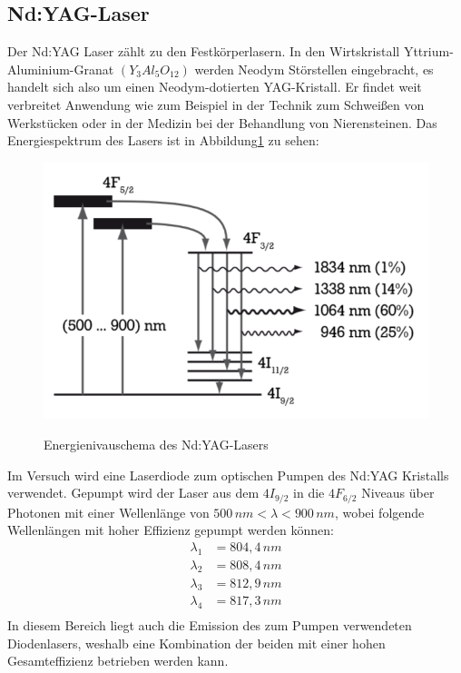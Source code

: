 \documentclass[twoside,colorback,accentcolor=tud4c,11pt]{tudreport}
\begin{document}
\subsection{Nd:YAG-Laser}
Der Nd:YAG Laser zählt zu den Festkörperlasern. In den Wirtskristall Yttrium-Aluminium-Granat $(Y_{3}Al_{5}O_{12})$ werden Neodym Störstellen eingebracht, es handelt sich also um einen Neodym-dotierten YAG-Kristall. Er findet weit verbreitet Anwendung wie zum Beispiel in der Technik zum Schweißen von Werkstücken oder in der Medizin bei der Behandlung von Nierensteinen. Das Energiespektrum des Lasers ist in Abbildung\ref{ndschem} zu sehen:
\begin{figure}[H]
\centering
   	\begin{minipage}[b]{0.5\textwidth}
   	\includegraphics[width=\textwidth]{graphics/ndyagschem.PNG}
  	\label{ndschem}
   	\end{minipage}
\caption{Energienivauschema des Nd:YAG-Lasers}\cite{anl} 	
\end{figure}
Im Versuch wird eine Laserdiode zum optischen Pumpen des Nd:YAG Kristalls verwendet. Gepumpt wird der Laser aus dem $4I_{9/2}$ in die $4F_{6/2}$ Niveaus über Photonen mit einer Wellenlänge von $500\,\si{nm}<\lambda<900\,\si{nm}$, wobei folgende Wellenlängen mit hoher Effizienz gepumpt werden können:
\begin{align}
\lambda_{1}&=804,4\,\si{nm}\\
\lambda_{2}&=808,4\,\si{nm}\\
\lambda_{3}&=812,9\,\si{nm}\\
\lambda_{4}&=817,3\,\si{nm}\\
\end{align}
In diesem Bereich liegt auch die Emission des zum Pumpen verwendeten Diodenlasers, weshalb eine Kombination der beiden mit einer hohen Gesamteffizienz betrieben werden kann.\\
\end{document}
